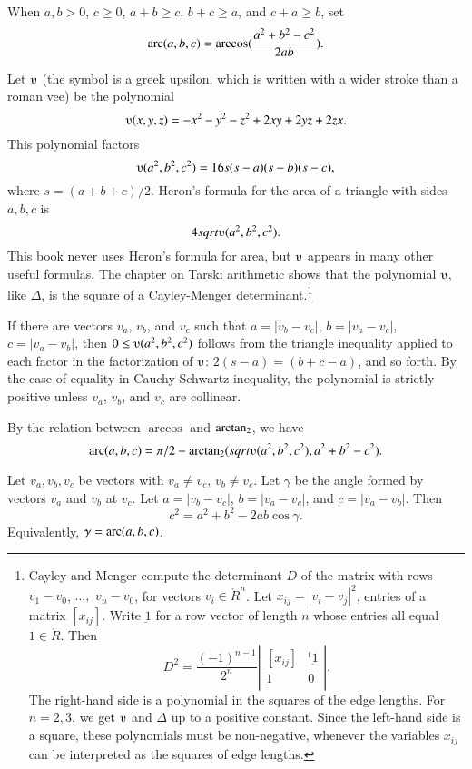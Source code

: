 \begin{definition}[arc]
When $a,b>0$, $c\ge0$,  $a + b \ge c$, $b + c \ge a$, 
and $c+a \ge b$, set 
 $$\operatorname{arc}(a,b,c) = \arccos(\frac{a^2 + b^2 - c^2}{2 a b}).$$
\end{definition}

Let $\ups$ (the symbol is a greek upsilon, which is written with a
wider stroke than a roman vee) be the polynomial
    $$\ups(x,y,z) = -x^2 - y^2 - z^2 + 2 x y + 2 y z + 2 z x.$$
This polynomial factors
    $$\ups(a^2,b^2,c^2) = 16 s (s-a) (s-b) (s-c),$$
where $s = (a+b+c)/2$.  Heron's formula for the area of 
a triangle with
sides $a,b,c$ is $$4\sqrt{\ups(a^2,b^2,c^2)}.$$  This
book never uses Heron's formula for area, but $\ups$
appears in many other useful formulas.  The chapter on
Tarski arithmetic shows that the polynomial
$\ups$, like $\Delta$, 
is the square of a Cayley-Menger determinant.\footnote{
Cayley and Menger compute the determinant $D$ of the
matrix with rows $v_1-v_0$, $\ldots,$ $v_n-v_0$, 
for vectors $v_i\in\ring{R}^n$.   Let
$x_{ij} = |v_i-v_j|^2$, entries of a matrix $[x_{ij}]$.
Write $\underbar 1$ for a row vector of length $n$ 
whose entries all equal $1\in\ring{R}$.
Then 
$$
D^2 = \frac{(-1)^{n-1}}{2^n}
    \left|\begin{matrix}[x_{ij}]& {}^t{\underbar 1}\\ {\underbar 1}& 0
        \end{matrix}\right|.
$$
The right-hand side is a polynomial in the squares of the edge lengths.
For $n=2,3$, we get $\ups$  and $\Delta$ up to a positive constant.  Since
the left-hand side is a square, these polynomials must
be non-negative, whenever the variables $x_{ij}$ can be interpreted
as the squares of edge lengths.}



If there are vectors $v_a$, $v_b$, and $v_c$ such that $a = |v_b
- v_c|$, $b = |v_a - v_c|$, $c = |v_a - v_b|$, then $0\le
\ups(a^2,b^2,c^2)$ follows from the triangle inequality applied to
each factor in the factorization of $\ups$: $2(s-a) = (b+c-a)$, and
so forth.  By the case of equality in Cauchy-Schwartz
inequality, the polynomial is strictly positive unless $v_a$,
$v_b$, and $v_c$ are collinear.

By the relation between $\arccos$ and ${\operatorname{arctan_2}}$, we have
  $$
  \arc(a,b,c) = 
    \pi/2 - \atn({\sqrt{\ups(a^2,b^2,c^2)}},{ a^2 + b^2 - c^2}).
    $$



\begin{lemma}
Let $v_a,v_b,v_c$ be vectors with $v_a\ne v_c$, $v_b\ne v_c$.
    Let $\gamma$ be the angle formed by vectors $v_a$ and $v_b$ at $v_c$.  Let $a
    = |v_b - v_c|$, $b = |v_a - v_c|$, and $c = |v_a - v_b|$.  Then
        $$c^2 = a^2 + b^2 - 2 a b \cos\gamma.$$
Equivalently, $\gamma = \operatorname{arc}(a,b,c)$.

\end{lemma} 

